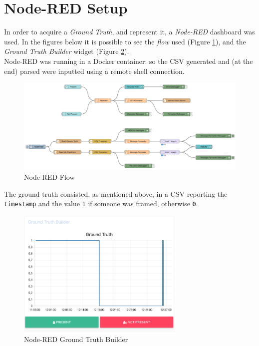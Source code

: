 \documentclass{article}
\begin{document}

\section{Node-RED Setup}

In order to acquire a \textit{Ground Truth}, and represent it, a \textit{Node-RED} dashboard was used. In the figures below it is possible to see the \textit{flow} used (Figure \ref{fig::node-red-flow}), and the \textit{Ground Truth Builder} widget (Figure \ref{fig::node-red-dashboard}). \\ Node-RED was running in a Docker container: so the CSV generated and (at the end) parsed were inputted using a remote shell connection.

\begin{figure}[h!]
	\centering
	\includegraphics[width=12cm]{assets/node-red-flow.png}
	\caption{Node-RED Flow}
	\label{fig::node-red-flow}
\end{figure}
The ground truth consisted, as mentioned above, in a CSV reporting the \texttt{timestamp} and the value \texttt{1} if someone was framed, otherwise \texttt{0}.

\begin{figure}[h!]
	\centering
	\includegraphics[width=8cm]{assets/ground-truth-builder.png}
	\caption{Node-RED Ground Truth Builder}
	\label{fig::node-red-dashboard}
\end{figure}
\end{document}
